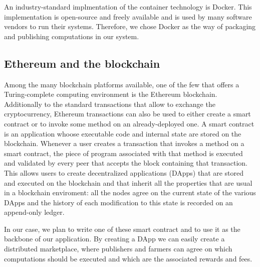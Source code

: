 An industry-standard implmentation of the container technology is Docker. This implementation is open-source and freely available and is used by many software vendors to run their systems. Therefore, we chose Docker \cite{docker-website} as the way of packaging and publishing computations in our system.

\subsection{Ethereum and the blockchain}
Among the many blockchain platforms available, one of the few that offers a Turing-complete computing environment is the Ethereum blockchain. Additionally to the standard transactions that allow to exchange the cryptocurrency, Ethereum transactions can also be used to either create a smart contract or to invoke some method on an already-deployed one. A smart contract is an application whoose executable code and internal state are stored on the blockchain. Whenever a user creates a transaction that invokes a method on a smart contract, the piece of program associated with that method is executed and validated by every peer that accepts the block containing that transaction. This allows users to create decentralized applications (DApps) that are stored and executed on the blockchain and that inherit all the properties that are usual in a blockchain enviroment: all the nodes agree on the current state of the various DApps and the history of each modification to this state is recorded on an append-only ledger.

In our case, we plan to write one of these smart contract and to use it as the backbone of our application. By creating a DApp we can easily create a distributed marketplace, where publishers and farmers can agree on which computations should be executed and which are the associated rewards and fees.
